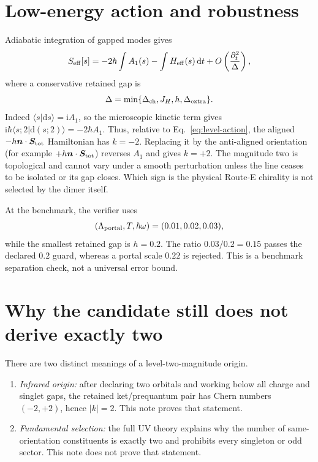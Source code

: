 \documentclass[11pt]{article}
\theoremstyle{definition}
\theoremstyle{remark}
\newcommand{\ii}{\mathrm i}
\newcommand{\dd}{\mathrm d}
\newcommand{\braket}[2]{\langle #1\vert #2\rangle}
\begin{document}
\section{Low-energy action and robustness}

Adiabatic integration of gapped modes gives
\begin{equation}
 S_{\rm eff}[s]
 =-2\hbar\int A_1(s)-\int H_{\rm eff}(s)\,\dd t
 +O\left(\frac{\partial_t^2}{\Delta}\right),
 \label{eq:effective-action}
\end{equation}
where a conservative retained gap is
\begin{equation}
 \Delta=\min\{\Delta_{\rm ch},J_H,h,\Delta_{\rm extra}\}.
 \label{eq:retained-gap}
\end{equation}
Indeed \(\braket{s}{\dd s}=\ii A_1\), so the microscopic kinetic term gives
\(\ii\hbar\braket{s;2}{\dd(s;2)}=-2\hbar A_1\).  Thus, relative to
Eq.~\eqref{eq:level-action}, the aligned \(-h\bm n\cdot\bm S_{\rm tot}\)
Hamiltonian has \(k=-2\).  Replacing it by the anti-aligned orientation (for
example \(+h\bm n\cdot\bm S_{\rm tot}\)) reverses \(A_1\) and gives \(k=+2\).
The magnitude two is topological and cannot vary under a smooth perturbation
unless the line ceases to be isolated or its gap closes.  Which sign is the
physical Route-E chirality is not selected by the dimer itself.

At the benchmark, the verifier uses
\begin{equation}
 (\Lambda_{\rm portal},T,\hbar\omega)=(0.01,0.02,0.03),
\end{equation}
while the smallest retained gap is \(h=0.2\).  The ratio \(0.03/0.2=0.15\)
passes the declared \(0.2\) guard, whereas a portal scale \(0.22\) is rejected.
This is a benchmark separation check, not a universal error bound.

\section{Why the candidate still does not derive exactly two}

There are two distinct meanings of a level-two-magnitude origin.
\begin{enumerate}
\item \emph{Infrared origin:} after declaring two orbitals and working below
  all charge and singlet gaps, the retained ket/prequantum pair has Chern
  numbers \((-2,+2)\), hence \(|k|=2\).  This note proves that statement.
\item \emph{Fundamental selection:} the full UV theory explains why the
  number of same-orientation constituents is exactly two and prohibits every
  singleton or odd sector.  This note does not prove that statement.
\end{enumerate}
\end{document}
